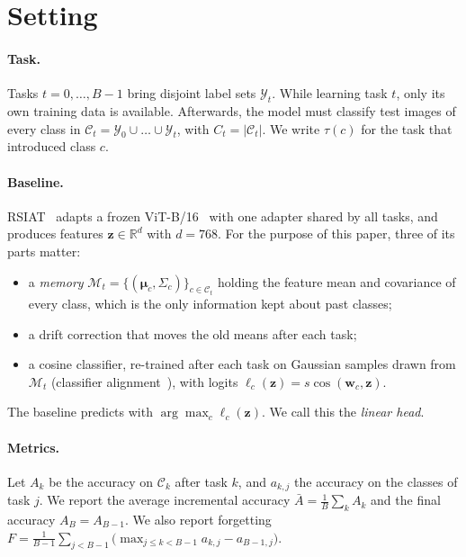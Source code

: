 \section{Setting}
\label{sec:setting}

\paragraph{Task.}
Tasks $t=0,\dots,B-1$ bring disjoint label sets $\mathcal Y_t$. While learning
task $t$, only its own training data is available. Afterwards, the model
must classify test images of every class in
$\mathcal C_t=\mathcal Y_0\cup\dots\cup\mathcal Y_t$, with $C_t=|\mathcal C_t|$.
We write $\tau(c)$ for the task that introduced class $c$.

\paragraph{Baseline.}
RSIAT~\cite{rsiat} adapts a frozen ViT-B/16~\cite{dosovitskiy2021vit} with one
adapter shared by all tasks, and produces features
$\mathbf z\in\mathbb R^{d}$ with $d=768$. For the purpose of this paper, three
of its parts matter:
\begin{itemize}
  \item a \emph{memory} $\mathcal M_t=\{(\boldsymbol\mu_c,\Sigma_c)\}_{c\in\mathcal C_t}$
    holding the feature mean and covariance of every class, which is the
    only information kept about past classes;
  \item a drift correction that moves the old means after each task;
  \item a cosine classifier, re-trained after each task on Gaussian samples
    drawn from $\mathcal M_t$ (classifier alignment~\cite{zhang2023slca}), with
    logits $\ell_c(\mathbf z)=s\cos(\mathbf w_c,\mathbf z)$.
\end{itemize}
The baseline predicts with $\arg\max_c\ell_c(\mathbf z)$. We call this the
\emph{linear head}.

\paragraph{Metrics.}
Let $A_k$ be the accuracy on $\mathcal C_k$ after task $k$, and $a_{k,j}$ the
accuracy on the classes of task $j$. We report the average incremental
accuracy $\bar A=\frac1B\sum_kA_k$ and the final accuracy $A_B=A_{B-1}$. We
also report forgetting
$F=\frac1{B-1}\sum_{j<B-1}\big(\max_{j\le k<B-1}a_{k,j}-a_{B-1,j}\big)$.

